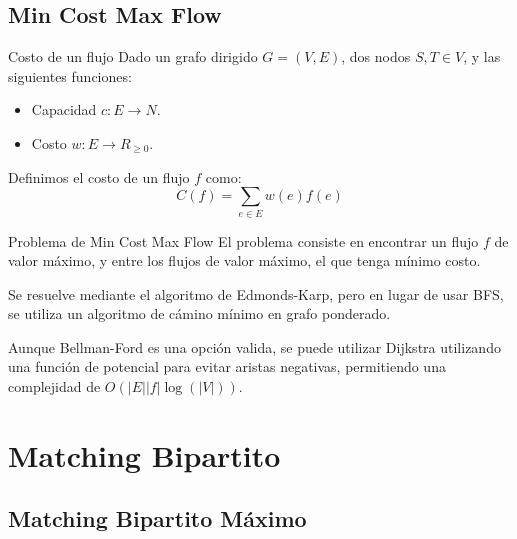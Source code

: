 \documentclass{beamer}
\begin{document}
\subsection{ Min Cost Max Flow }

\begin{frame}{Costo de un flujo}
    Dado un grafo dirigido $G = (V,E)$, dos nodos $S,T \in V$, y las siguientes funciones:
    
    \begin{itemize}
        \item Capacidad $c: E \to N$.
        \item Costo $w: E \to R_{\geq 0}$.
    \end{itemize}

    Definimos el costo de un flujo $f$ como:
    \[
        C(f) = \sum_{e \in E} w(e)f(e)
    \]
\end{frame}

\begin{frame}{Problema de Min Cost Max Flow}
    El problema consiste en encontrar un flujo $f$ de valor máximo, y entre los flujos de valor máximo, el que tenga mínimo costo.

    Se resuelve mediante el algoritmo de Edmonds-Karp, pero en lugar de usar BFS, se utiliza un algoritmo de cámino mínimo en grafo ponderado.

    Aunque Bellman-Ford es una opción valida, se puede utilizar Dijkstra utilizando una función de potencial para evitar aristas negativas, permitiendo una complejidad de
    $O(|E||f|\log(|V|) )$.
\end{frame}

\section{Matching Bipartito}
    \subsection{ Matching Bipartito Máximo}
\end{document}
